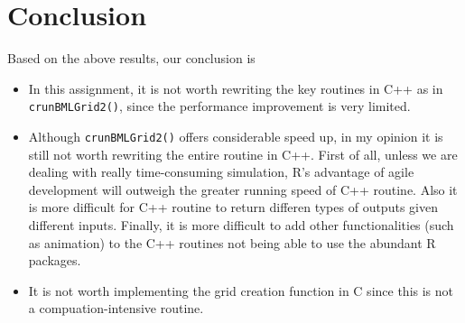 \documentclass{article}
\begin{document}
\section{Conclusion}
Based on the above results, our conclusion is
\begin{itemize}
    \item In this assignment, it is not worth rewriting the key routines in C++
    as in \texttt{crunBMLGrid2()}, since the performance improvement is very
    limited.
    \item Although \texttt{crunBMLGrid2()} offers considerable speed up, in my
    opinion it is still not worth rewriting the entire routine in C++. First of
    all, unless we are dealing with really time-consuming simulation, R's
    advantage of agile development will outweigh the greater running speed of
    C++ routine. Also it is more difficult for C++ routine to return
    differen types of outputs given different inputs. Finally, it is more
    difficult to add other functionalities (such as animation) to the C++
    routines not being able to use the abundant R packages.
    \item It is not worth implementing the grid creation function in C since
    this is not a compuation-intensive routine.
\end{itemize}
\end{document}
